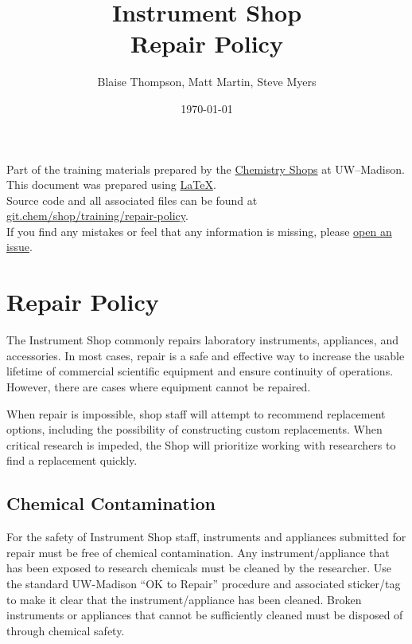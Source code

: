 \documentclass{training}
\title{Instrument Shop \\ Repair Policy}
\date{\today}
\author{Blaise Thompson, Matt Martin, Steve Myers}
\begin{document}
\maketitle
\renewcommand{\baselinestretch}{0.5}\normalsize
\tableofcontents
\renewcommand{\baselinestretch}{1.0}\normalsize
\vfill

Part of the training materials prepared by the \href{https://shops.chem.wisc.edu/}{Chemistry Shops} at UW--Madison. \\
This document was prepared using \href{https://www.latex-project.org/}{\LaTeX}. \\
Source code and all associated files can be found at \href{https://git.chem.wisc.edu/shop/training/repair-policy}{git.chem/shop/training/repair-policy}. \\
If you find any mistakes or feel that any information is missing, please \href{https://git.chem.wisc.edu/shop/training/pcb-etching/issues}{open an issue}. \\

\clearpage

\section{Repair Policy}

The Instrument Shop commonly repairs laboratory instruments, appliances, and accessories.
In most cases, repair is a safe and effective way to increase the usable lifetime of commercial scientific equipment and ensure continuity of operations.
However, there are cases where equipment cannot be repaired.

When repair is impossible, shop staff will attempt to recommend replacement options, including the possibility of constructing custom replacements.
When critical research is impeded, the Shop will prioritize working with researchers to find a replacement quickly.

\subsection{Chemical Contamination}

For the safety of Instrument Shop staff, instruments and appliances submitted for repair must be free of chemical contamination.
Any instrument/appliance that has been exposed to research chemicals must be cleaned by the researcher.
Use the standard UW-Madison “OK to Repair” procedure and associated sticker/tag to make it clear that the instrument/appliance has been cleaned.
Broken instruments or appliances that cannot be sufficiently cleaned must be disposed of through chemical safety.
\end{document}
